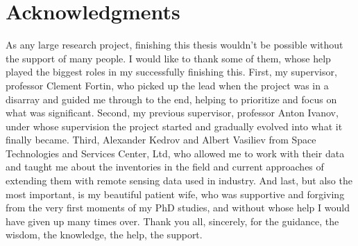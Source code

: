 \section*{Acknowledgments}

As any large research project, finishing this thesis wouldn't be possible without the support of many people.
I would like to thank some of them, whose help played the biggest roles in my successfully finishing this.
First, my supervisor, professor Clement Fortin, who picked up the lead when the project was in a disarray and guided me through to the end, helping to prioritize and focus on what was significant.
Second, my previous supervisor, professor Anton Ivanov, under whose supervision the project started and gradually evolved into what it finally became.
Third, Alexander Kedrov and Albert Vasiliev from Space Technologies and Services Center, Ltd, who allowed me to work with their data and taught me about the inventories in the field and current approaches of extending them with remote sensing data used in industry.
And last, but also the most important, is my beautiful patient wife, who was supportive and forgiving from the very first moments of my PhD studies, and without whose help I would have given up many times over.
Thank you all, sincerely, for the guidance, the wisdom, the knowledge, the help, the support.

